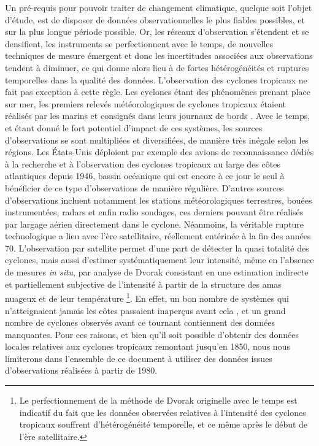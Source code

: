 \documentclass[../main.tex]{subfiles}
\begin{document}
Un pré-requis pour pouvoir traiter de changement climatique, quelque soit l'objet d'étude, est de disposer de données observationnelles le plus fiables
possibles, et sur la plus longue période possible. Or, les réseaux d'observation s'étendent et se densifient, les instruments se perfectionnent avec le temps,
de nouvelles techniques de mesure émergent et donc les incertitudes associées aux observations tendent à diminuer, ce qui donne alors lieu à de fortes
hétérogénéités et ruptures temporelles dans la qualité des données. L'observation des cyclones tropicaux ne fait pas exception à cette règle. Les cyclones étant
des phénomènes prenant place sur mer, les premiers relevés météorologiques de cyclones tropicaux étaient réalisés par les marins et consignés dans leurs journaux
de bords \parencite{knapp_international_2010}. Avec le temps, et étant donné le fort potentiel d'impact de ces systèmes, les sources d'observations se sont
multipliées et diversifiées, de manière très inégale selon les régions. Les États-Unis déploient par exemple des avions de reconnaissance dédiés à la recherche et
à l'observation des cyclones tropicaux au large des côtes atlantiques depuis \num{1946}, bassin océanique qui est encore à ce jour le seul à bénéficier de ce type
d'observations de manière régulière. D'autres sources d'observations incluent notamment les stations météorologiques terrestres, bouées instrumentées, radars et
enfin radio sondages, ces derniers pouvant être réalisés par largage aérien directement dans le cyclone. Néanmoins, la véritable rupture technologique a lieu
avec l'ère satellitaire, réellement entérinée à la fin des années 70. L'observation par satellite permet d'une part de détecter la quasi totalité des cyclones,
mais aussi d'estimer systématiquement leur intensité, même en l'absence de mesures \textit{in situ}, par analyse de Dvorak consistant en une estimation
indirecte et partiellement subjective de l'intensité à partir de la structure des amas nuageux et de leur température
\parencite{dvorak_tropical_1975,velden_development_1998,olander_development_2002,olander_advanced_2007,olander_advanced_2019}\footnote{Le perfectionnement de la
méthode de Dvorak originelle avec le temps est indicatif du fait que les données observées relatives à l'intensité des cyclones tropicaux souffrent
d'hétérogénéité temporelle, et ce même après le début de l'ère satellitaire.}. En effet, un bon nombre de systèmes qui n'atteignaient jamais les côtes passaient
inaperçus avant cela \parencite{landsea_atlantic_2004}, et un grand nombre de cyclones observés avant ce tournant contiennent des données manquantes. Pour ces
raisons, et bien qu'il soit possible d'obtenir des données locales relatives aux cyclones tropicaux remontant jusqu'en \num{1850}, nous nous limiterons dans
l'ensemble de ce document à utiliser des données issues d'observations réalisées à partir de \num{1980}.
\end{document}
